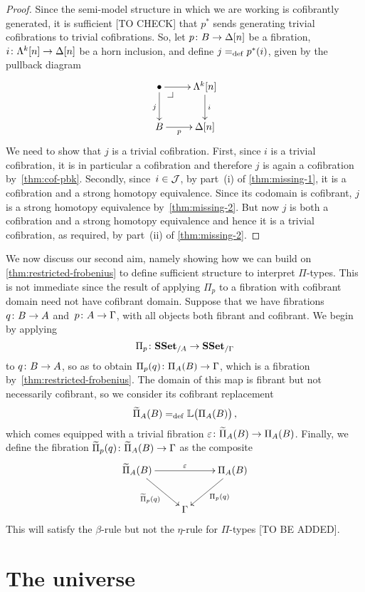 \documentclass[reqno,10pt,a4paper,oneside,draft]{amsart}
\begin{document}
\begin{proof}  Since the semi-model structure in which we 
are working is cofibrantly generated, it is sufficient [TO CHECK] that $p^*$ sends generating trivial cofibrations to trivial cofibrations. So, let $p \co B \to \Delta[n]$ be a fibration, $i \co \Lambda^k[n]
\to \Delta[n]$ be a horn inclusion, and define $ j \defeq p^*(i)$, given by 
the pullback diagram
\[
\xymatrix{
\bullet  \ar[r] \ar[d]_j \drpullback & \Lambda^k[n] \ar[d]^{i} \\
B \ar[r]_-{p} & \Delta[n] }
\]
We need to show that $j$ is a trivial cofibration.  
First, since $i$ is a trivial cofibration, it is in particular
a cofibration and therefore $j$ is again a cofibration by~\cref{thm:cof-pbk}. Secondly, since~$i \in \cal{J}$,
by part~(i) of \cref{thm:missing-1}, it is a cofibration and a strong homotopy equivalence. Since its codomain is cofibrant, $j$ is a strong homotopy equivalence by~\cref{thm:missing-2}.
But now $j$ is both a cofibration and a strong homotopy equivalence
and hence it is a trivial cofibration, as required, by part~(ii) of \cref{thm:missing-2}.
\end{proof} 


We now discuss our second aim, namely showing how we can build on \cref{thm:restricted-frobenius} 
to define sufficient structure to interpret $\Pi$-types. This is not immediate since the result of applying $\Pi_p$ to a 
fibration with cofibrant domain need not have cofibrant domain.
 Suppose that we have fibrations 
$q \co B \to A$ and~$p \co A \to \Gamma$, with
all objects both fibrant and cofibrant. 
We begin by applying 
\[
\Pi_p  \co \SSet_{/A} \to \SSet_{/\Gamma}
\]
to $q \co B \to A$, so as to obtain $\Pi_p(q) \co \Pi_A(B) \to \Gamma$, which is
a fibration by~\cref{thm:restricted-frobenius}. The domain of this map is fibrant but
not necessarily cofibrant, so we consider its cofibrant replacement 
\[
\widetilde{\Pi}_A(B) \defeq \mathbb{L} \big( \Pi_A(B)  \big) \, ,
\]
which comes equipped with a trivial fibration $\varepsilon \co \widetilde{\Pi}_A(B) \to \Pi_A(B)$.
Finally, we define the fibration $\widetilde{\Pi}_p(q) \co \widetilde{\Pi}_A(B) \to \Gamma$ as 
 the composite
 \[
\xymatrix{
\widetilde{\Pi}_A(B) \ar[rr]^{\varepsilon} \ar[dr]_{\widetilde{\Pi}_p(q) } & & \Pi_A(B) \ar[dl]^{\Pi_p(q)}  \\
 & \Gamma &} 
 \]
This will satisfy the $\beta$-rule but not the $\eta$-rule for $\Pi$-types [TO BE ADDED].


\newpage

\section{The universe}
\end{document}
